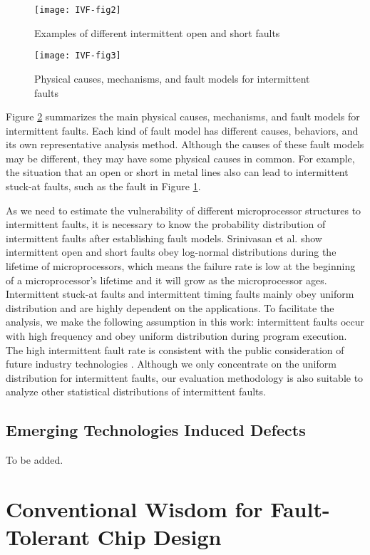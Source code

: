 \begin{figure}[t]
\centering
\texttt{[image: IVF-fig2]}
\caption{Examples of different intermittent open and short faults}
\label{fig:open-short-faults} 
\end{figure}

\begin{figure}[t]
\centering
\texttt{[image: IVF-fig3]}
\caption{Physical causes, mechanisms, and fault models for intermittent faults}
\label{fig:fault-cause} 
\end{figure}


Figure \ref{fig:fault-cause} summarizes the main physical causes, mechanisms, and fault models for intermittent faults. Each kind of fault model has different causes, behaviors, and its own representative analysis method. Although the causes of these fault models may be different, they may have some physical causes in common. For example, the situation that an open or short in metal lines also can lead to intermittent stuck-at faults, such as the fault in Figure \ref{fig:open-short-faults}.

As we need to estimate the vulnerability of different microprocessor structures to intermittent faults, it is necessary to know the probability distribution of intermittent faults after establishing fault models. Srinivasan et al. \cite{srinivasan2005exploiting} show intermittent open and short faults obey log-normal distributions during the lifetime of microprocessors, which means the failure rate is low at the beginning of a microprocessor’s lifetime and it will grow as the microprocessor ages. Intermittent stuck-at faults and intermittent timing faults mainly obey uniform distribution and are highly dependent on the applications. To facilitate the analysis, we make the following assumption in this work: intermittent faults occur with high frequency and obey uniform distribution during program execution. The high intermittent fault rate is consistent with the public consideration of future industry technologies \cite{borkar2003parameter}. Although we only concentrate on the uniform distribution for intermittent faults, our evaluation methodology is also suitable to analyze other statistical distributions of intermittent faults.

\subsection{Emerging Technologies Induced Defects}
To be added.

\section{Conventional Wisdom for Fault-Tolerant Chip Design}
